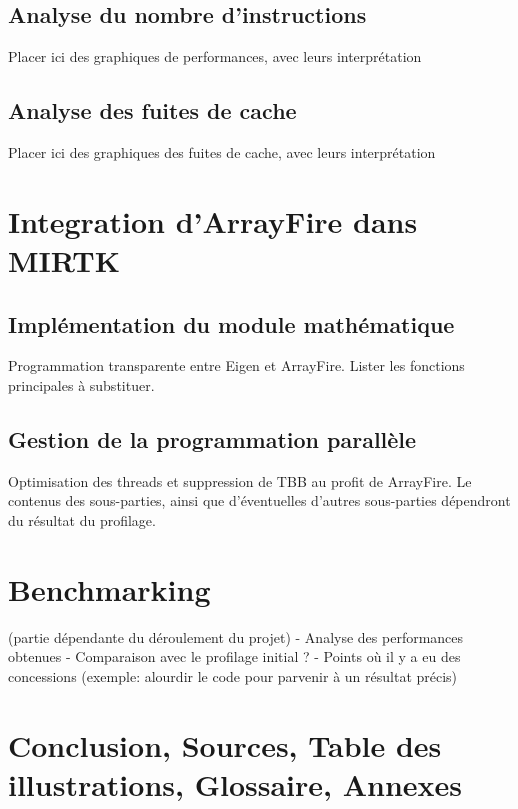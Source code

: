 \documentclass[12pt]{report}
\begin{document}
	\subsection{Analyse du nombre d'instructions}
	
	Placer ici des graphiques de performances, avec leurs interprétation
	\subsection{Analyse des fuites de cache}
	
	Placer ici des graphiques des fuites de cache, avec leurs interprétation
	
	\section{Integration d'ArrayFire dans MIRTK}
	\subsection{Implémentation du module mathématique}
	Programmation transparente entre Eigen et ArrayFire.
	Lister les fonctions principales à substituer.
	\subsection{Gestion de la programmation parallèle}
	Optimisation des threads et suppression de TBB au profit de ArrayFire.
	\newline
	Le contenus des sous-parties, ainsi que d'éventuelles d'autres sous-parties dépendront du résultat du profilage.
	\section{Benchmarking}
	(partie dépendante du déroulement du projet)\newline
	- Analyse des performances obtenues \newline
	- Comparaison avec le profilage initial ? \newline
	- Points où il y a eu des concessions (exemple: alourdir le code pour parvenir à un résultat précis)
\section*{Conclusion, Sources, Table des illustrations, Glossaire, Annexes} %
	
\end{document}
